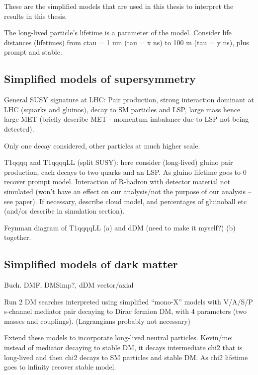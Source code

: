 These are the simplified models that are used in this thesis to interpret the 
results in this thesis.

The long-lived particle's lifetime is a parameter of the model. Consider life 
distances (lifetimes) from ctau = 1 um (tau = x ns) to 100 m (tau = y ns), plus 
prompt and stable.


\subsection{Simplified models of supersymmetry}

General SUSY signature at LHC: Pair production, strong interaction dominant at 
LHC (squarks and gluinos), decay to SM particles and LSP, large mass hence 
large MET (briefly describe MET - momentum imbalance due to LSP not being 
detected).

Only one decay considered, other particles at much higher scale.

T1qqqq and T1qqqqLL (split SUSY): here consider (long-lived) gluino pair 
production, each decays to two quarks and an LSP. As gluino lifetime goes to 0 
recover prompt model.
Interaction of R-hadron with detector material not simulated (won't have an 
effect on our analysis/not the purpose of our analysis -- see paper). If 
necessary, describe cloud model, and percentages of gluinoball etc (and/or 
describe in simulation section).

Feynman diagram of T1qqqqLL (a) and dDM (need to make it myself?) (b) together.

\subsection{Simplified models of dark matter}
Buch.
DMF, DMSimp?, dDM vector/axial

Run 2 DM searches interpreted using simplified ``mono-X'' models with V/A/S/P 
s-channel mediator pair decaying to Dirac fermion DM, with 4 parameters (two 
masses and couplings).
(Lagrangians probably not necessary)

Extend these models to incorporate long-lived neutral particles. Kevin/me: 
instead of mediator decaying to stable DM, it decays intermediate chi2 that is 
long-lived and then chi2 decays to SM particles and stable DM. As chi2 lifetime 
goes to infinity recover stable model.

